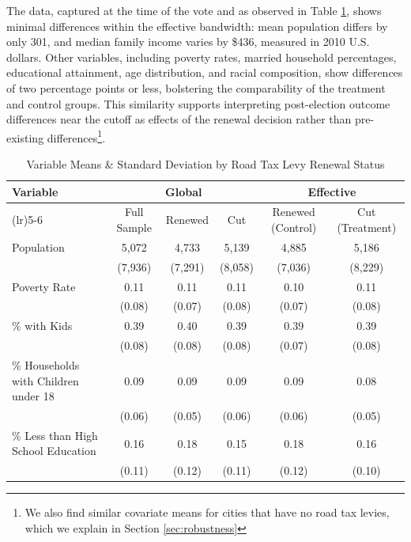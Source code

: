 The data, captured at the time of the vote and as observed in Table \ref{tab:variable_means_sd}, shows minimal differences within the effective bandwidth: mean population differs by only 301, and median family income varies by \$436, measured in 2010 U.S. dollars. Other variables, including poverty rates, married household percentages, educational attainment, age distribution, and racial composition, show differences of two percentage points or less, bolstering the comparability of the treatment and control groups. This similarity supports interpreting post-election outcome differences near the cutoff as effects of the renewal decision rather than pre-existing differences\footnote{We also find similar covariate means for cities that have no road tax levies, which we explain in Section \ref{sec:robustness}}.

\begin{table}[H]
    \centering
    \caption{Variable Means \& Standard Deviation by Road Tax Levy Renewal Status}
    \label{tab:variable_means_sd}
    \begingroup
    \footnotesize
    \setlength{\tabcolsep}{3pt}
    \begin{tabular}{>{\raggedright\arraybackslash}p{3.4cm}ccccc}
    \hline
    Variable & \multicolumn{3}{c}{Global} & \multicolumn{2}{c}{Effective} \\
    \cmidrule(lr){2-4} \cmidrule(lr){5-6}
    & Full Sample & Renewed & Cut & Renewed (Control) & Cut (Treatment) \\
    \hline
    Population & 5,072 & 4,733 & 5,139 & 4,885 & 5,186 \\
                & (7,936) & (7,291) & (8,058) & (7,036) & (8,229) \\
    Poverty Rate & 0.11 & 0.11 & 0.11 & 0.10 & 0.11 \\
                    & (0.08) & (0.07) & (0.08) & (0.07) & (0.08) \\
    \% with Kids & 0.39 & 0.40 & 0.39 & 0.39 & 0.39 \\
                    & (0.08) & (0.08) & (0.08) & (0.07) & (0.08) \\
    \% Households with Children under 18 & 0.09 & 0.09 & 0.09 & 0.09 & 0.08 \\
                                            & (0.06) & (0.05) & (0.06) & (0.06) & (0.05) \\
    \% Less than High School Education & 0.16 & 0.18 & 0.15 & 0.18 & 0.16 \\
                                        & (0.11) & (0.12) & (0.11) & (0.12) & (0.10) \\

\end{tabular}
\end{table}
